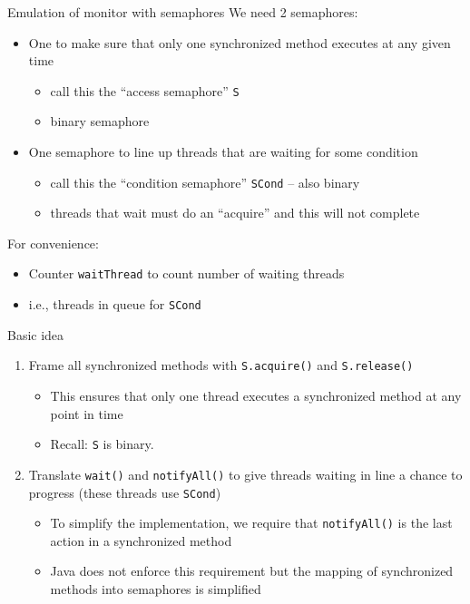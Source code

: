 \begin{frame}{Emulation of monitor with semaphores}
  We need 2 semaphores:
  \begin{itemize}
  \item	One to make sure that only one synchronized method executes at any given time
    \begin{itemize}
    \item call this the ``access semaphore'' \lstinline!S!
    \item binary semaphore
    \end{itemize}
  \item One semaphore to line up threads that are waiting for some condition
    \begin{itemize}
    \item call this the ``condition semaphore'' \lstinline!SCond! --
      also binary
    \item threads that wait must do an ``acquire'' and this will not
      complete
    \end{itemize}
  \end{itemize}


  For  convenience:
  \begin{itemize}
  \item Counter \lstinline!waitThread! to count number of waiting
    threads
  \item i.e., threads in queue for \lstinline!SCond!
  \end{itemize}
\end{frame}

\begin{frame}{Basic idea}
  \begin{enumerate}
  \item Frame all synchronized methods with \lstinline!S.acquire()! and
    \lstinline!S.release()!
    \begin{itemize}
    \item This ensures that only one thread executes a synchronized
      method at any point in time
    \item Recall: \lstinline!S! is binary.
    \end{itemize}
  \item Translate \lstinline!wait()! and \lstinline!notifyAll()! to give threads waiting in
    line a chance to progress (these threads use \lstinline!SCond!)
    \begin{itemize}
    \item To simplify the implementation, we require that
      \lstinline!notifyAll()! is the last action in a synchronized
      method
    \item Java does not enforce this requirement but the mapping of
      synchronized methods into semaphores is simplified
    \end{itemize}
  \end{enumerate}
\end{frame}

